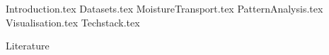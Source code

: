 \documentclass[aspectratio=169]{beamer}
\begin{document}
\maketitlepage %

{Introduction.tex}
{Datasets.tex}
{MoistureTransport.tex}
{PatternAnalysis.tex}
{Visualisation.tex}
{Techstack.tex}
\begin{frame}[allowframebreaks]{Literature}
\printbibliography
\end{frame}
\end{document}
